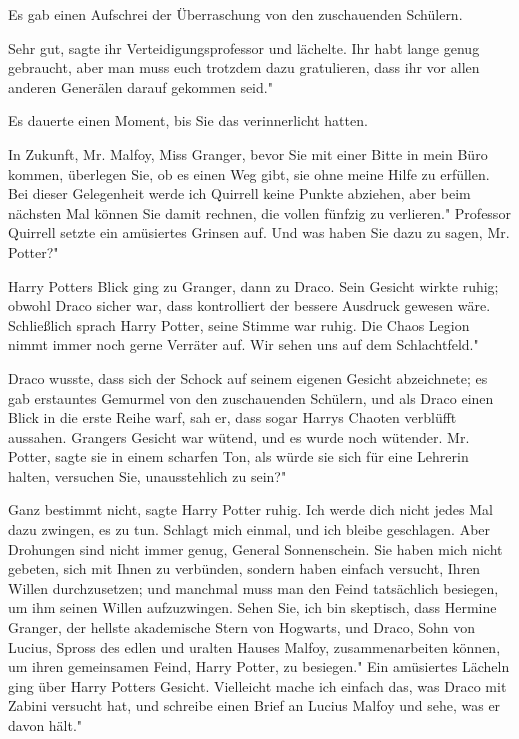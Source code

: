 Es gab einen Aufschrei der Überraschung von den zuschauenden Schülern.

\glqq Sehr gut\grqq{}, sagte ihr Verteidigungsprofessor und lächelte. \glqq Ihr
habt lange genug gebraucht, aber man muss euch trotzdem dazu gratulieren, dass
ihr vor allen anderen Generälen darauf gekommen seid."

Es dauerte einen Moment, bis Sie das verinnerlicht hatten.

\glqq In Zukunft, Mr. Malfoy, Miss Granger, bevor Sie mit einer Bitte in mein
Büro kommen, überlegen Sie, ob es einen Weg gibt, sie ohne meine Hilfe zu
erfüllen. Bei dieser Gelegenheit werde ich Quirrell keine Punkte abziehen, aber
beim nächsten Mal können Sie damit rechnen, die vollen fünfzig zu verlieren."
Professor Quirrell setzte ein amüsiertes Grinsen auf. \glqq Und was haben Sie
dazu zu sagen, Mr. Potter?"

Harry Potters Blick ging zu Granger, dann zu Draco. Sein Gesicht wirkte ruhig;
obwohl Draco sicher war, dass kontrolliert der bessere Ausdruck gewesen wäre.
Schließlich sprach Harry Potter, seine Stimme war ruhig. \glqq Die Chaos Legion
nimmt immer noch gerne Verräter auf. Wir sehen uns auf dem Schlachtfeld."

Draco wusste, dass sich der Schock auf seinem eigenen Gesicht abzeichnete; es
gab erstauntes Gemurmel von den zuschauenden Schülern, und als Draco einen Blick
in die erste Reihe warf, sah er, dass sogar Harrys Chaoten verblüfft aussahen.
Grangers Gesicht war wütend, und es wurde noch wütender. \glqq Mr.
Potter\grqq{}, sagte sie in einem scharfen Ton, als würde sie sich für eine
Lehrerin halten, \glqq versuchen Sie, unausstehlich zu sein?"

\glqq Ganz bestimmt nicht\grqq{}, sagte Harry Potter ruhig. \glqq Ich werde dich
nicht jedes Mal dazu zwingen, es zu tun. Schlagt mich einmal, und ich bleibe
geschlagen. Aber Drohungen sind nicht immer genug, General Sonnenschein. Sie
haben mich nicht gebeten, sich mit Ihnen zu verbünden, sondern haben einfach
versucht, Ihren Willen durchzusetzen; und manchmal muss man den Feind
tatsächlich besiegen, um ihm seinen Willen aufzuzwingen. Sehen Sie, ich bin
skeptisch, dass Hermine Granger, der hellste akademische Stern von Hogwarts, und
Draco, Sohn von Lucius, Spross des edlen und uralten Hauses Malfoy,
zusammenarbeiten können, um ihren gemeinsamen Feind, Harry Potter, zu besiegen."
Ein amüsiertes Lächeln ging über Harry Potters Gesicht. \glqq Vielleicht mache
ich einfach das, was Draco mit Zabini versucht hat, und schreibe einen Brief an
Lucius Malfoy und sehe, was er davon hält."

